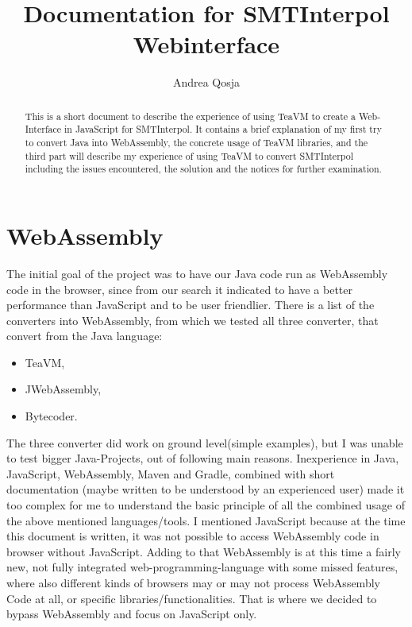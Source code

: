 \documentclass[12pt]{article}
\title{Documentation for SMTInterpol Webinterface}
\author{Andrea Qosja}
\begin{document}
\maketitle

\begin{abstract}
This is a short document to describe the experience of using TeaVM to create a Web-Interface in JavaScript for SMTInterpol.
It contains a brief explanation of my first try to convert Java into WebAssembly, the concrete usage of TeaVM libraries, and the third part will describe my experience of using TeaVM to convert SMTInterpol including the issues encountered, the solution and the notices for further examination.
\end{abstract}

\section{WebAssembly}

The initial goal of the project was to have our Java code run as WebAssembly code in the browser, since from our search it indicated to have a better performance than JavaScript and to be user friendlier. There is a list\cite{1} of the converters into WebAssembly, from which we tested all three converter, that convert from the Java language:
\begin{itemize}
\item TeaVM,
\item JWebAssembly,
\item Bytecoder.
\end{itemize}

The three converter did work on ground level(simple examples), but I was unable to test bigger Java-Projects, out of following main reasons.
Inexperience in Java, JavaScript, WebAssembly, Maven and Gradle,
combined with short documentation (maybe written to be understood by an experienced user) made it too complex for me to understand the basic principle of all the combined usage of the above mentioned languages/tools. I mentioned JavaScript because at the time this document is written, it was not possible to access WebAssembly code in browser without JavaScript. Adding to that WebAssembly is at this time a fairly new, not fully integrated web-programming-language with some missed features, where also different kinds of browsers may or may not process WebAssembly Code at all, or specific libraries/functionalities. That is where we decided to bypass WebAssembly and focus on JavaScript only.
\end{document}

